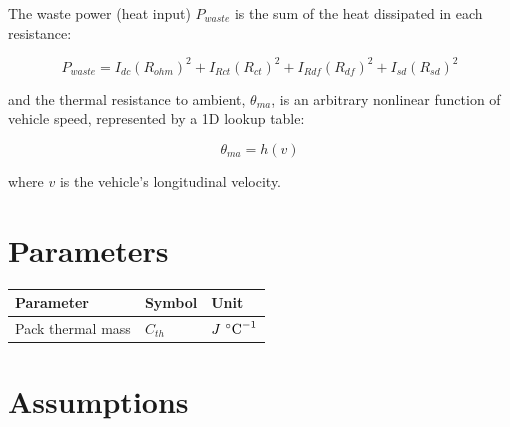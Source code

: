 \documentclass{article}
\begin{document}
		The waste power (heat input) $P_{waste}$ is the sum of the heat dissipated in each resistance:
		
		\begin{equation}
			P_{waste} = I_{dc} (R_{ohm})^2 + I_{Rct} (R_{ct})^2 + I_{Rdf} (R_{df})^2 + I_{sd} (R_{sd})^2
		\end{equation}
		
		and the thermal resistance to ambient, $\theta_{ma}$, is an arbitrary nonlinear function of vehicle speed, represented by a 1D lookup table:
		
		\begin{equation}
			\theta_{ma} = h(v)
		\end{equation}
		
		where $v$ is the vehicle's longitudinal velocity.
		
		

\section{Parameters}
	\begin{tabular}{ l | l | l  }
		Parameter				&	Symbol		&	Unit					\\	\hline
		Pack thermal mass			&	$C_{th}$		&	$J \text{ \degree C}^{-1}$
	\end{tabular}
	



\section{Assumptions}
\end{document}
